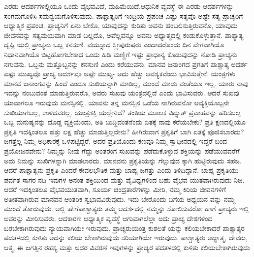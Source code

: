 ಎರಡು ಆದರ್ಶಗಳಲ್ಲಿಯೂ ಒಂದು ವೈಭವವಿದೆ, ಮಹಿಮೆಯಿದೆ.ಆಧುನಿಕ ವ್ಯವಸ್ಥೆ ಈ ಎರಡು ಆದರ್ಶಗಳನ್ನು ಸಂಗಮಗೊಳಿಸಿ ಸಮನ್ವಯಗೊಳಿಸುವುದು. ಪಾಶ್ಚಾತ್ಯರಿಗೆ ಇಂದ್ರಿಯ ಪ್ರಪಂಚ ಎಷ್ಟು ಸತ್ಯವೊ ಅಷ್ಟೇ ಸತ್ಯ ಪ್ರಾಚ್ಯರಿಗೆ ಆಧ್ಯಾತ್ಮಿಕ ಪ್ರಪಂಚ. ಪ್ರಾಚ್ಯನಿಗೆ ಏನು ಬೇಕೊ, ಯಾವುದನ್ನು ಕುರಿತು ಅವನು ಹಂಬಲಿಸುತ್ತಿರುವನೊ, ಯಾವುದು ಜೀವನವನ್ನು ಸತ್ಯಮಯವಾಗಿ ಮಾಡ ಬಲ್ಲದೊ, ಅವೆಲ್ಲವನ್ನೂ ಅವನು ಅಧ್ಯಾತ್ಮದಲ್ಲಿ ಕಂಡುಕೊಳ್ಳುತ್ತಾನೆ. ಪಾಶ್ಯಾತ್ಯ ದೃಷ್ಟಿ ಯಲ್ಲಿ ಪ್ರಾಚ್ಯನು ಒಬ್ಬ ಕನಸುಣಿ. ವಯಸ್ಸಾದ ಸ್ತ್ರೀಪುರುಷರು ಎಂದಾದರೊಂದು ದಿನ ವೇಗವಾಗಿಯೊ ನಿಧಾನವಾಗಿಯೊ ಬಿಟ್ಟಹೋಗಬೇಕಾದ ಒಂದು ಹಿಡಿ ಮಣ್ಣಿಗೆ ಇಷ್ಟು ಪ್ರಾಧಾನ್ಯ ಕೊಡುವುದನ್ನು ನೋಡಿ ಪ್ರಾಚ್ಯನು ನಗುವನು. ಒಬ್ಬನು ಮತ್ತೊಬ್ಬನನ್ನು ಕನಸುಣಿ ಎಂದು ಕರೆಯುವನು. ಮಾನವ ಜನಾಂಗದ ಪ್ರಗತಿಗೆ ಪಾಶ್ಚಾತ್ಯ ಅದರ್ಶ ಎಷ್ಟು ಮುಖ್ಯವೊ ಪ್ರಾಚ್ಯ ಆದರ್ಶವೂ ಅಷ್ಟೇ ಮುಖ್ಯ- ಅದು ಹೆಚ್ಚು ಆವಶ್ಯಕವೆಂದು ಭಾವಿಸುತ್ತೇನೆ. ಯಂತ್ರಗಳು ಮಾನವ ಜನಾಂಗವನ್ನು ಹಿಂದೆ ಎಂದೂ ಸುಖಿಯನ್ನಾಗಿ ಮಾಡಿಲ್ಲ, ಮುಂದೆ ಮಾಡು ವಂತೆಯೂ ಇಲ್ಲ. ಯಾರು ನಾವು ಇದನ್ನು ನಂಬುವಂತೆ ಮಾಡುತ್ತಿರುವರೊ, ಅವರು ಸುಖವು ಯಂತ್ರದಲ್ಲಿದೆ ಎಂದು ಭಾವಿಸುವರು. ಆದರೆ ಸುಖವು ಯಾವಾಗಲೂ ಇರುವುದು ಮನಸ್ಸಿನಲ್ಲಿ. ಯಾವನು ತನ್ನ ಮನಸ್ಸಿನ ಒಡೆಯ ನಾಗಿರುವನೋ ಆವ್ಯಕ್ತಿಯೊಬ್ಬನೇ ಸುಖಿಯಾಗಬಲ್ಲ, ಉಳಿದವರಲ್ಲ. ಯಂತ್ರಶಕ್ತಿ ಯಲ್ಲೇನಿದೆ? ತಂತಿಯ ಮೂಲಕ ವಿದ್ಯುತ್​ ಪ್ರವಾಹವನ್ನು ಹರಿಸಬಲ್ಲ ಒಬ್ಬ ಮನುಷ್ಯನನ್ನು ದೊಡ್ಡ ವ್ಯಕ್ತಿಯೆಂದು, ಅತಿ ಬುದ್ಧಿವಂತನೆಂದು ಏತಕ್ಕೆ ನಾವು ಕರೆಯಬೇಕು? ಪ್ರತಿ ಕ್ಷಣದಲ್ಲಿಯೂ ಪ್ರಕೃತಿ ಇದಕ್ಕಿಂತಲೂ ಹತ್ತು ಲಕ್ಷ ಹೆಚ್ಚು ಮಾಡುತ್ತಿಲ್ಲವೇನು? ಹೀಗಿರುವಾಗ ಪ್ರಕೃತಿಗೆ ಬಾಗಿ ಏತಕ್ಕೆ ಪೂಜಿಸಬಾರದು? ಜಗತ್ತೆಲ್ಲ ನಿಮ್ಮ ಅಧಿಕಾರಕ್ಕೆ ಒಳಪಟ್ಟಿದ್ದರೆ, ಅದರ ಪ್ರತಿಯೊಂದು ಕಣವೂ ನಿಮ್ಮ ಸ್ವಾಧೀನದಲ್ಲಿ ಇದ್ದರೆ ಬಂದ ಪ್ರಯೋಜನವೇನು? ನಿಮ್ಮನ್ನು ನೀವು ಗೆದ್ದು ಅಂತರಂಗ ಸುಖವನ್ನು ಪಡೆದುಕೊಳ್ಳುವ ಶಕ್ತಿಯನ್ನು ಪಡೆಯುವವರೆಗೆ ಅದು ನಿಮನ್ನು ಸುಖಿಗಳನ್ನಾಗಿ ಮಾಡಲಾರದು. ಮಾನವನು ಪ್ರಕೃತಿಯನ್ನು ಗೆಲ್ಲುವುದ ಕ್ಕಾಗಿ ಹುಟ್ಟಿರುವುದು ಸಹಜ. ಆದರೆ ಪಾಶ್ಚಾತ್ಯನು ಪ್ರಕೃತಿ ಎಂದರೆ ಕೇವಲಭೌತಿಕ ಮತ್ತು ಬಾಹ್ಯ ಜಗತ್ತು ಎಂದು ತಿಳಿದಿದ್ದಾನೆ. ಬಾಹ್ಯ ಪ್ರಕೃತಿಯು ಪರ್ವತ ಸಾಗರ ನದಿ ಇವುಗಳ ಅನಂತ ಶಕ್ತಿಯಿಂದ ಮತ್ತು ವೈವಿಧ್ಯಗಳಿಂದ ಬಹು ವೈಭವ ಯುತವಾಗಿರುವುದು ನಿಜ. ಆದರೆ ಇದಕ್ಕಿಂತಲೂ ವೈಭವಯುತವಾಗಿ, ಸೂರ್ಯ ಚಂದ್ರತಾರೆಗಳನ್ನು ಮೀರಿ, ನಮ್ಮ ಕಿರಿಯ ಜೀವನಗಳಿಗೆ ಅತೀತವಾಗಿರುವ ಮಾನವನ ಆಂತರಿಕ ಸ್ವಭಾವವಿರುವುದು. ಇದು ಬೇರೊಂದು ಬಗೆಯ ಅಧ್ಯಯನ ವನ್ನು ನಮ್ಮ ಮುಂದೆ ತೋರುವುದು. ಅಲ್ಲಿ ಹೇಗೆಪಾಶ್ಚಾತ್ಯರು ತಮ್ಮ ಆದರ್ಶದಲ್ಲಿ ನಮ್ಮನ್ನು ಸೋಲಿಸುವರೋ ಹಾಗೆ ಪ್ರಾಚ್ಯರು ಇಲ್ಲಿ ಅವರನ್ನು ಮೀರಿಸುವರು. ಆದಕಾರಣ ಆಧ್ಯಾತ್ಮಿಕ ವ್ಯವಸ್ಥೆ ಆಗುವಾಗಲೆಲ್ಲಾ ಅದು ಪ್ರಾಚ್ಯ ದೇಶಗಳಿಂದ ಬರಬೇಕಾಗಿರುವುದು ನ್ಯಾಯವಾಗಿಯೇ ಇರುವುದು. ಪ್ರಾಚ್ಯರುಯಂತ್ರ ಕುಶಲತೆ ಯನ್ನು ಕಲಿಯಬೇಕಾದರೆ ಪಾಶ್ಚಾತ್ಯರ ಪದತಳದಲ್ಲಿ ಕುಳಿತು ಅದನ್ನು ಕಲಿಯ ಬೇಕಾಗಿರುವುದು ಸರಿಯಾಗಿಯೇ ಇರುವುದು. ಪಾಶ್ಚಾತ್ಯರು ಅಧ್ಯಾತ್ಮ, ದೇವರು, ಆತ್ಮ, ಈ ಜಗತ್ತಿನ ರಹಸ್ಯ ಮತ್ತು ಅದರ ವಿವರಣೆ ಇವುಗಳನ್ನು ಪ್ರಾಚ್ಯರ ಪದತಳದಲ್ಲಿ ಕುಳಿತು ಕಲಿಯಬೇಕಾಗಿರುವುದು

